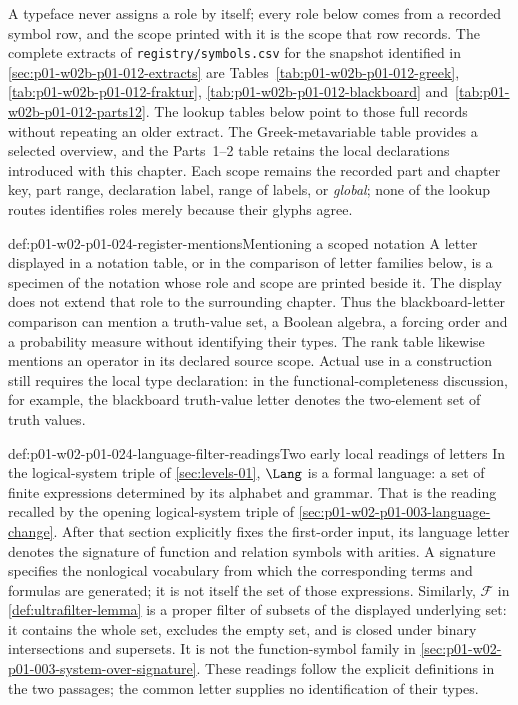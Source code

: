 A typeface never assigns a role by itself; every role below comes from a
recorded symbol row, and the scope printed with it is the scope that row
records.  The complete extracts of \texttt{registry/symbols.csv} for the
snapshot identified in \cref{sec:p01-w02b-p01-012-extracts} are
Tables~\ref{tab:p01-w02b-p01-012-greek}, \ref{tab:p01-w02b-p01-012-fraktur},
\ref{tab:p01-w02b-p01-012-blackboard} and~\ref{tab:p01-w02b-p01-012-parts12}.
The lookup tables below point to those full records without repeating an
older extract.  The Greek-metavariable table provides a selected overview,
and the Parts~1--2 table retains the local declarations introduced with
this chapter.  Each scope remains the recorded part and chapter key, part
range, declaration label, range of labels, or \emph{global}; none of the
lookup routes identifies roles merely because their glyphs agree.

\begin{hbconvention}{def:p01-w02-p01-024-register-mentions}{Mentioning a scoped notation}
A letter displayed in a notation table, or in the comparison of letter
families below, is a specimen of the notation whose role and scope are
printed beside it.  The display does not extend that role to the surrounding
chapter.  Thus the blackboard-letter comparison can mention a truth-value
set, a Boolean algebra, a forcing order and a probability measure without
identifying their types.  The rank table likewise mentions an operator in
its declared source scope.  Actual use in a construction still requires
the local type declaration: in the functional-completeness discussion,
for example, the blackboard truth-value letter denotes the two-element
set of truth values.
\end{hbconvention}

\begin{hbconvention}{def:p01-w02-p01-024-language-filter-readings}{Two early local readings of letters}
In the logical-system triple of \cref{sec:levels-01}, \(\Lang\) is a
formal language: a set of finite expressions determined by its alphabet
and grammar.  That is the reading recalled by the opening logical-system
triple of \cref{sec:p01-w02-p01-003-language-change}.  After that section
explicitly fixes the first-order input, its language letter denotes the
signature of function and relation symbols with arities.  A signature
specifies the nonlogical vocabulary from which the corresponding terms
and formulas are generated; it is not itself the set of those expressions.
Similarly, \(\mathcal F\) in \cref{def:ultrafilter-lemma} is a proper
filter of subsets of the displayed underlying set: it contains the whole
set, excludes the empty set, and is closed under binary intersections and
supersets.  It is not the function-symbol family in
\cref{sec:p01-w02-p01-003-system-over-signature}.
These readings follow the explicit definitions in the two passages;
the common letter supplies no identification of their types.
\end{hbconvention}

